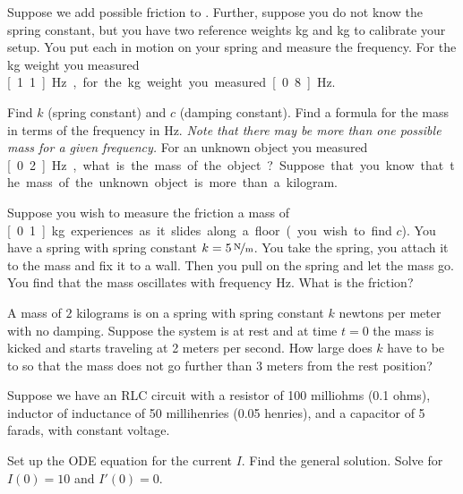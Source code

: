 \begin{exercise}
Suppose we add possible friction to .
Further, suppose you do not know the spring constant, but you have
two reference weights \unit[1]{kg} and \unit[2]{kg} to calibrate your setup.
You put each in motion on your spring and measure the
frequency.  For the \unit[1]{kg}
weight you measured \unit[1.1]{Hz}, for the \unit[2]{kg} weight you
measured \unit[0.8]{Hz}.
\begin{tasks}
\task Find $k$ (spring constant) and $c$ (damping constant).
\task Find a formula for the mass in terms of the frequency in Hz.  \emph{Note that
there may be more than one possible mass for a given frequency.}
\task For an unknown object you measured \unit[0.2]{Hz}, what is the mass of the
object?  Suppose that you know that the mass of the unknown object
is more than a kilogram.
\end{tasks}
\end{exercise}

\begin{exercise}
Suppose you wish to measure the friction a mass of \unit[0.1]{kg} experiences
as it slides along a floor (you wish to find $c$).  You have a spring with
spring constant $k=\unitfrac[5]{N}{m}$.  You take the spring, you attach it
to the mass and fix it to a wall.  Then you pull on the spring and let the
mass go.  You find that the mass oscillates with frequency \unit[1]{Hz}.
What is the friction?
\end{exercise}

\setcounter{exercise}{100}

\begin{exercise}
A mass of $2$ kilograms is on a spring with spring constant $k$ newtons per
meter with no damping.  Suppose the system is at rest and at time $t=0$ the
mass is kicked and starts traveling at 2 meters per second.  How large
does $k$ have to be to so that the mass does not go further than 3 meters
from the rest position?
\end{exercise}

\begin{exercise}
Suppose we have an RLC circuit with a resistor of 100 milliohms (0.1 ohms),
inductor of inductance of 50 millihenries (0.05 henries), and a capacitor of 5 farads, with
constant voltage.
\begin{tasks}
\task Set up the ODE equation for the current $I$.
\task Find the general solution.
\task Solve for $I(0) = 10$ and $I'(0) = 0$.
\end{tasks}
\end{exercise}

